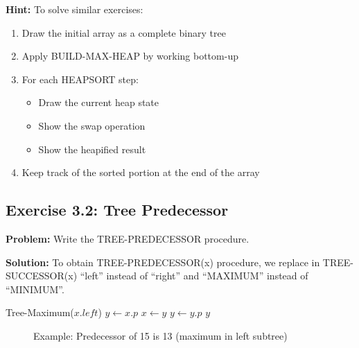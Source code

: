 \textbf{Hint:} To solve similar exercises:
\begin{enumerate}
    \item Draw the initial array as a complete binary tree
    \item Apply BUILD-MAX-HEAP by working bottom-up
    \item For each HEAPSORT step:
       \begin{itemize}
          \item Draw the current heap state
          \item Show the swap operation
          \item Show the heapified result
       \end{itemize}
    \item Keep track of the sorted portion at the end of the array
\end{enumerate}

\subsection{Exercise 3.2: Tree Predecessor}
\textbf{Problem:} Write the TREE-PREDECESSOR procedure.

\textbf{Solution:} To obtain TREE-PREDECESSOR(x) procedure, we replace in TREE-SUCCESSOR(x) ``left'' instead of ``right'' and ``MAXIMUM'' instead of ``MINIMUM''.

\begin{algorithm}[H]
\begin{algorithmic}[1]
        \State \Return Tree-Maximum($x.left$)
    \EndIf
    \State $y \gets x.p$
        \State $x \gets y$
        \State $y \gets y.p$
    \EndWhile
    \State \Return $y$
\EndProcedure
\end{algorithmic}
\end{algorithm}

\begin{figure}[H]
    \centering
    \caption*{\footnotesize Example: Predecessor of 15 is 13 (maximum in left subtree)}
\end{figure}

